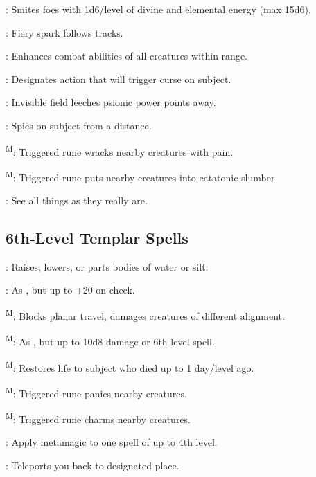 : Smites foes with 1d6/level of divine and elemental energy (max 15d6).

: Fiery spark follows tracks.

: Enhances combat abilities of all creatures within range.

: Designates action that will trigger curse on subject.

: Invisible field leeches psionic power points away.

: Spies on subject from a distance.

\textsuperscript{M}: Triggered rune wracks nearby creatures with pain.

\textsuperscript{M}: Triggered rune puts nearby creatures into catatonic slumber.

: See all things as they really are.



\subsection{6th-Level Templar Spells}

: Raises, lowers, or parts bodies of water or silt.

: As , but up to +20 on check.

\textsuperscript{M}: Blocks planar travel, damages creatures of different alignment.

\textsuperscript{M}: As , but up to 10d8 damage or 6th level spell.

\textsuperscript{M}: Restores life to subject who died up to 1 day/level ago.

\textsuperscript{M}: Triggered rune panics nearby creatures.

\textsuperscript{M}: Triggered rune charms nearby creatures.

: Apply metamagic to one spell of up to 4th level.

: Teleports you back to designated place.



